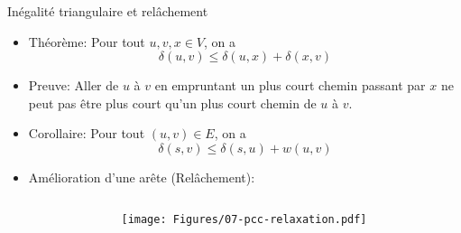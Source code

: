 \begin{frame}{Inégalité triangulaire et relâchement}
\begin{itemize}
\item \alert{Théorème:} Pour tout $u, v, x \in V$, on a
$$\delta(u,v)\leq \delta(u,x)+\delta(x,v)$$
\item \alert{Preuve:} Aller de $u$ à $v$ en empruntant un plus court chemin passant par $x$ ne peut pas être plus court qu'un plus court chemin de $u$ à $v$.

\bigskip

\item \alert{Corollaire:} Pour tout $(u,v)\in E$, on a $$\delta(s,v)\leq \delta(s,u)+w(u,v)$$

\bigskip

\item Amélioration d'une arête (\alert{Relâchement}):
\end{itemize}

\begin{columns}
\begin{column}{5cm}
\begin{center}
{\small
{}}
\end{center}
\end{column}
\begin{column}{5cm}
\centerline{\texttt{[image: Figures/07-pcc-relaxation.pdf]}}
\end{column}
\end{columns}

\end{frame}

